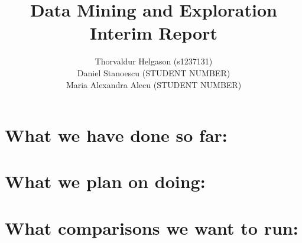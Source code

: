 \documentclass[a4paper,11pt]{article}
\title{Data Mining and Exploration\\Interim Report}
\author{Thorvaldur Helgason (s1237131) \\
Daniel Stanoescu (STUDENT NUMBER) \\
Maria Alexandra Alecu (STUDENT NUMBER)}
\begin{document}
    
\maketitle

\section*{What we have done so far:}

\section*{What we plan on doing:}

\section*{What comparisons we want to run:}
\end{document}
